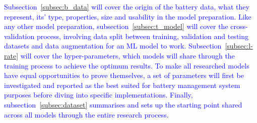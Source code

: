 %
\textcolor{blue}{
Subsection~\ref{subsec:b_data} will cover the origin of the battery data, what they represent, its' type, properties, size and usability in the model preparation.
Like any other model preparation, subsection~\ref{subsec:t_model} will cover the cross-validation process, involving data split between training, validation and testing datasets and data augmentation for an ML model to work.
Subsection~\ref{subsec:l-rate} will cover the hyper-parameters, which models will share through the training process to achieve the optimum results.
To make all researched models have equal opportunities to prove themselves, a set of parameters will first be investigated and reported as the best suited for battery management system purposes before diving into specific implementations.
Finally, subsection~\ref{subsec:dataset} summarises and sets up the starting point shared across all models through the entire research process.
}

%

